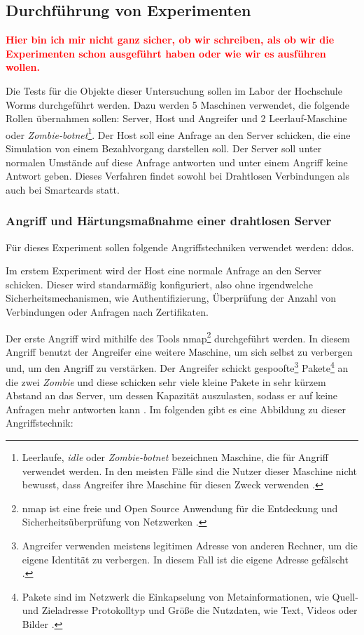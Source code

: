 \subsection{Durchführung von Experimenten}
\textcolor{red}{\textbf{Hier bin ich mir nicht ganz sicher, ob wir schreiben, als ob wir die Experimenten 
schon ausgeführt haben oder wie wir es ausführen wollen.}}

Die Tests für die Objekte dieser Untersuchung sollen im Labor der Hochschule Worms durchgeführt werden. Dazu werden 5 
Maschinen verwendet, die folgende Rollen übernahmen sollen: Server, Host und Angreifer und 2 Leerlauf-Maschine oder 
\textit{Zombie-botnet}\footnote{Leerlaufe, \textit{idle} oder \textit{Zombie-botnet} bezeichnen Maschine, die für Angriff
verwendet werden. In den meisten Fälle sind die Nutzer dieser Maschine nicht bewusst, dass Angreifer ihre Maschine für
diesen Zweck verwenden \cite{refart:XGDD}.}. Der Host soll eine Anfrage an den Server schicken, die eine Simulation
von einem Bezahlvorgang darstellen soll. Der Server soll unter normalen Umstände auf diese Anfrage antworten und unter
einem Angriff keine Antwort geben. Dieses Verfahren findet sowohl bei Drahtlosen Verbindungen als auch bei Smartcards statt.


\subsubsection{Angriff und Härtungsmaßnahme einer drahtlosen Server}
Für dieses Experiment sollen folgende Angriffstechniken verwendet werden: \acrfull{ddos}.

Im erstem Experiment wird der Host eine normale Anfrage an den Server schicken. Dieser wird standarmäßig konfiguriert,
also ohne irgendwelche Sicherheitsmechanismen, wie Authentifizierung, Überprüfung der Anzahl von Verbindungen oder Anfragen
nach Zertifikaten.

Der erste Angriff wird mithilfe des Tools \acrfull{nmap}\footnote{\acrshort{nmap} ist eine freie und Open 
Source Anwendung für die Entdeckung und Sicherheitsüberprüfung von Netzwerken \cite{refst:nmap}.} durchgeführt
werden. In diesem Angriff benutzt der Angreifer eine weitere Maschine, um sich selbst zu verbergen und, um den 
Angriff zu verstärken. Der Angreifer schickt gespoofte\footnote{Angreifer verwenden meistens legitimen Adresse 
von anderen Rechner, um die eigene Identität zu verbergen. In diesem Fall ist die eigene Adresse gefälscht 
\cite{refst:IPIO}.} Pakete\footnote{Pakete sind im Netzwerk die Einkapselung von Metainformationen, wie Quell-
und Zieladresse Protokolltyp und Größe die Nutzdaten, wie Text, Videos oder Bilder \cite{refbook:SWIS}.} an 
die zwei \textit{Zombie} und diese schicken sehr viele kleine Pakete in sehr kürzem Abstand an das Server, 
um dessen Kapazität auszulasten, sodass er auf keine Anfragen mehr antworten kann \cite{refip:KSDD}. Im 
folgenden gibt es eine Abbildung zu dieser Angriffstechnik:

